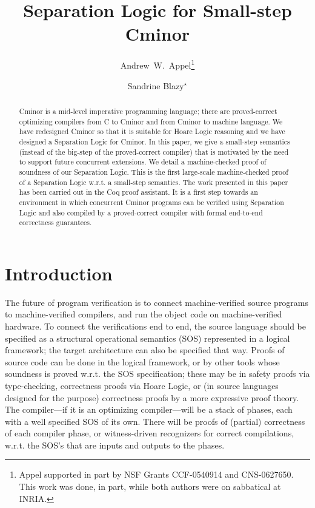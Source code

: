 \documentclass{llncs}
\newcommand{\cminor}{Cminor}
\begin{document}
\author{
Andrew~W.~Appel\fnmsep{}\thanks{Appel supported in part by NSF Grants CCF-0540914 and CNS-0627650.
This work was done, in part, while both authors were on sabbatical at INRIA.}
  \and
Sandrine Blazy\fnmsep{}$^\star$
}

\title{Separation Logic for Small-step \cminor}

\maketitle 

\pagestyle{plain}

\vspace{-20pt}
\begin{abstract}
\cminor{} is a mid-level imperative programming language;
there are proved-correct optimizing compilers
from C to \cminor{} and from \cminor{} to machine language.
We have redesigned \cminor{} so that it is suitable for Hoare Logic
reasoning and we have designed a Separation Logic for \cminor.
In this paper, we give a small-step semantics (instead of the big-step of
the proved-correct compiler) 
that is motivated by the need to support future concurrent extensions.
We detail a machine-checked proof of soundness of our Separation Logic.
This is the first large-scale machine-checked 
proof of a Separation Logic w.r.t. a small-step semantics.
The work presented in this paper has been carried out in the Coq proof assistant. 
It is a first step towards an
environment in which concurrent \cminor{} programs 
can be verified using Separation Logic
and also
compiled by a proved-correct compiler with formal
end-to-end correctness guarantees.
\end{abstract}

\section{Introduction}

The future of program
verification is to connect machine-verified source programs to
machine-verified compilers, and run the object code on 
machine-verified hardware.  To connect the verifications end to end,
the source language should be specified as a structural operational semantics
(SOS) represented
in a logical framework; the target architecture can also be specified
that way.  Proofs of source code can be done in the logical framework,
or by other tools whose soundness is proved w.r.t. the SOS
specification; 
these may be in safety proofs via type-checking,
correctness proofs via Hoare Logic,
or (in source languages designed for the purpose) 
correctness proofs by a more expressive proof theory.
The compiler---if it
is an optimizing compiler---will be a stack of
phases, each with a well specified SOS of its own.  There
will be proofs of (partial) correctness of each compiler phase, or
witness-driven recognizers for correct compilations, w.r.t.
the SOS's that are inputs and outputs to the phases.
\end{document}
